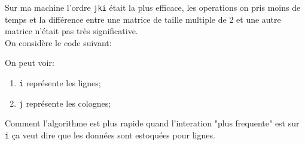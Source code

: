 \documentclass{article}
\begin{document}
\begin{resolution}
    Sur ma machine l'ordre \texttt{jki} était la plus efficace, les operations on pris moins de temps et la différence entre une matrice de taille multiple de 2 et une autre matrice n'était pas très significative.\\

    On considère le code suivant:
    \begin{scriptsize}
        \mycode
    \end{scriptsize}
    On peut voir:
    \begin{enumerate}[noitemsep]
        \item \texttt{i} représente les lignes;
        \item \texttt{j} représente les colognes;
    \end{enumerate}
    Comment l'algorithme est plus rapide quand l'interation "plus frequente" est sur \texttt{i} ça veut dire que les données sont estoquées pour lignes.

\end{resolution}
\end{document}
